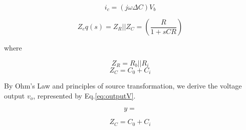 \documentclass[journal]{IEEEtran}
\begin{document}
\begin{figure}[ht]

	\begin{equation}
		i_c = (j \omega \Delta C) V_b
		\label{eq:SmallCurr}
	\end{equation}

	\begin{equation}
		Z_eq(s) = Z_R || Z_C = \left(\frac{R}{1 + sCR}\right)
		\label{eq:Impedance}
	\end{equation}

\end{figure}

where

\begin{figure}[ht]

	\begin{equation}
		Z_R = R_b || R_i
		\label{eq:ImpedanceR}
	\end{equation}
	\begin{equation}
		Z_C = C_0 + C_i
		\label{eq:ImpedanceC}
	\end{equation}

\end{figure}

By Ohm's Law and principles of source transformation, we derive the voltage output $v_o$, represented by Eq.\ref{eq:outputV}.

\begin{figure}[ht]

	\begin{equation}
		y =
		\label{eq:outputV}
	\end{equation}

	\begin{equation}
		Z_C = C_0 + C_i
		\label{eq:ImpedanceC}
	\end{equation}

\end{figure}

%
%
\end{document}
